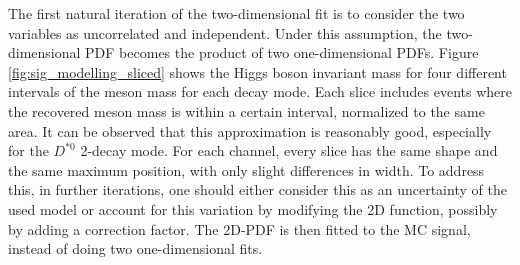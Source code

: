 The first natural iteration of the two-dimensional fit is to consider the two variables as uncorrelated and independent. Under this assumption, the two-dimensional PDF becomes the product of two one-dimensional PDFs. Figure \ref{fig:sig_modelling_sliced} shows the Higgs boson invariant mass for four different intervals of the meson mass for each decay mode. Each slice includes events where the recovered meson mass is within a certain interval, normalized to the same area. It can be observed that this approximation is reasonably good, especially for the $D^{*0}$ 2-decay mode. For each channel, every slice has the same shape and the same maximum position, with only slight differences in width. To address this, in further iterations, one should either consider this as an uncertainty of the used model or account for this variation by modifying the 2D function, possibly by adding a correction factor. The 2D-PDF is then fitted to the MC signal, instead of doing two one-dimensional fits.
